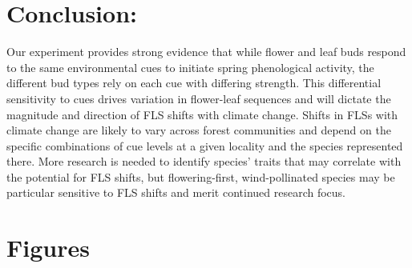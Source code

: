 \documentclass[11pt]{article}
\begin{document}
\section*{Conclusion:}
\noindent Our experiment provides strong evidence that while flower and leaf buds respond to the same environmental cues to initiate spring phenological activity, the different bud types rely on each cue with differing strength. This differential sensitivity to cues drives variation in flower-leaf sequences and will dictate the magnitude and direction of FLS shifts with climate change. Shifts in FLSs with climate change are likely to vary across forest communities and depend on the specific combinations of cue levels at a given locality and the species represented there. More research is needed to identify species' traits that may correlate with the potential for FLS shifts, but flowering-first, wind-pollinated species may be particular sensitive to FLS shifts and merit continued research focus.

 



\section*{Figures}
\end{document}
